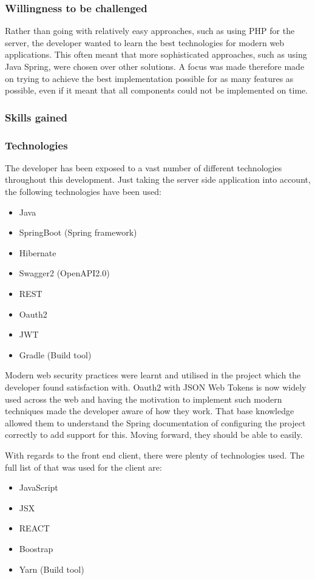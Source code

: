\subsubsection*{Willingness to be challenged}
Rather than going with relatively easy approaches, such as using PHP for the server, the developer wanted to learn the best technologies for modern web applications.
This often meant that more sophisticated approaches, such as using Java Spring, were chosen over other solutions.
A focus was made therefore made on trying to achieve the best implementation possible for as many features as possible, even if it meant that all components 
could not be implemented on time.


\subsubsection{Skills gained}

\subsubsection*{Technologies}
The developer has been exposed to a vast number of different technologies throughout this development.
Just taking the server side application into account, the following technologies have been used:
\begin{itemize}
    \tightlist
    \item Java
    \item SpringBoot (Spring framework)
    \item Hibernate
    \item Swagger2 (OpenAPI2.0)
    \item REST
    \item Oauth2 
    \item JWT
    \item Gradle (Build tool)
\end{itemize}

Modern web security practices were learnt and utilised in the project which the developer found satisfaction with.
Oauth2 with JSON Web Tokens is now widely used across the web and having the motivation to implement such modern techniques made the developer aware 
of how they work.
That base knowledge allowed them to understand the Spring documentation of configuring the project correctly to add support for this.
Moving forward, they should be able to easily. 

With regards to the front end client, there were plenty of technologies used.
The full list of that was used for the client are: 
\begin{itemize}
    \tightlist
    \item JavaScript
    \item JSX
    \item REACT
    \item Boostrap
    \item Yarn (Build tool)
\end{itemize}

